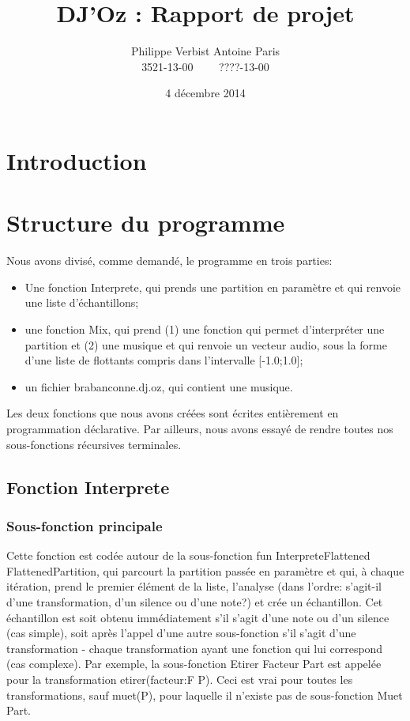 \documentclass[12pt,a4paper]{article}
\author{Philippe Verbist  Antoine Paris\\3521-13-00 \ \ \ \ ????-13-00}
\title{DJ'Oz : Rapport de projet}
\date{4 décembre 2014}
\begin{document}
\maketitle

\section{Introduction}

\section{Structure du programme}

Nous avons divisé, comme demandé, le programme en trois parties:
\begin{itemize}
\item Une fonction Interprete, qui prends une partition en paramètre et qui renvoie une liste d'échantillons;
\item une fonction Mix, qui prend (1) une fonction qui permet d'interpréter une partition  et (2) une musique et qui renvoie un vecteur audio, sous la forme d'une liste de flottants compris dans l'intervalle [-1.0;1.0];
\item un fichier brabanconne.dj.oz, qui contient une musique.
\end{itemize}

Les deux fonctions que nous avons créées sont écrites entièrement en programmation déclarative. Par ailleurs, nous avons essayé de rendre toutes nos sous-fonctions récursives terminales.

\subsection{Fonction Interprete}

\subsubsection{Sous-fonction principale}

Cette fonction est codée autour de la sous-fonction fun {InterpreteFlattened FlattenedPartition}, qui parcourt la partition passée en paramètre et qui, à chaque itération, prend le premier élément de la liste, l'analyse (dans l'ordre: s'agit-il d'une transformation, d'un silence ou d'une note?) et crée un échantillon. Cet échantillon est soit obtenu immédiatement s'il s'agit d'une note ou d'un silence (cas simple), soit après l'appel d'une autre sous-fonction s'il s'agit d'une transformation - chaque transformation ayant une fonction qui lui correspond (cas complexe). Par exemple, la sous-fonction {Etirer Facteur Part} est appelée pour la transformation etirer(facteur:F P). Ceci est vrai pour toutes les transformations, sauf muet(P), pour laquelle il n'existe pas de sous-fonction {Muet Part}.
\end{document}
